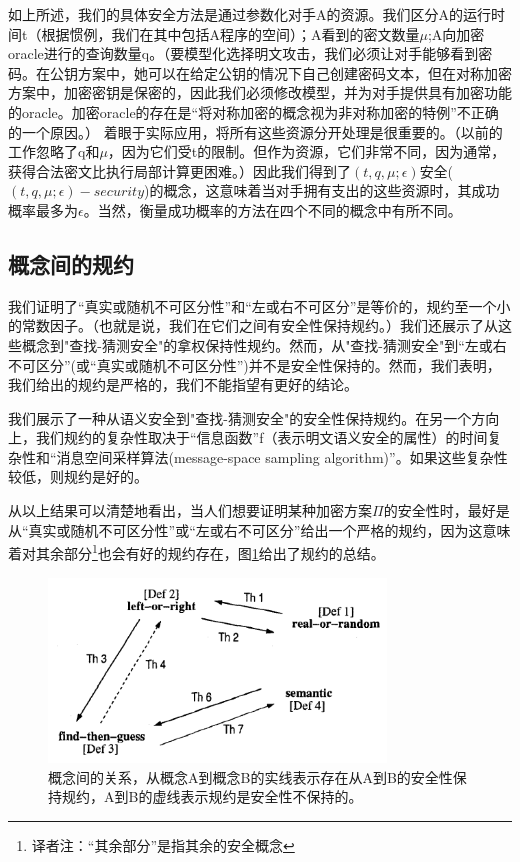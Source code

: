 \documentclass[]{article}
\begin{document}
如上所述，我们的具体安全方法是通过参数化对手A的资源。我们区分A的运行时间t（根据惯例，我们在其中包括A程序的空间）；A看到的密文数量$\mu$;A向加密oracle进行的查询数量q。（要模型化选择明文攻击，我们必须让对手能够看到密码。在公钥方案中，她可以在给定公钥的情况下自己创建密码文本，但在对称加密方案中，加密密钥是保密的，因此我们必须修改模型，并为对手提供具有加密功能的oracle。加密oracle的存在是“将对称加密的概念视为非对称加密的特例”不正确的一个原因。）
着眼于实际应用，将所有这些资源分开处理是很重要的。（以前的工作忽略了q和$\mu$，因为它们受t的限制。但作为资源，它们非常不同，因为通常，获得合法密文比执行局部计算更困难。）因此我们得到了$(t,q,\mu;\epsilon)$安全($(t,q,\mu;\epsilon)-security$)的概念，这意味着当对手拥有支出的这些资源时，其成功概率最多为$\epsilon$。当然，衡量成功概率的方法在四个不同的概念中有所不同。\par

\subsection{概念间的规约}
我们证明了“真实或随机不可区分性”和“左或右不可区分”是等价的，规约至一个小的常数因子。（也就是说，我们在它们之间有安全性保持规约。）我们还展示了从这些概念到"查找-猜测安全"的拿权保持性规约。然而，从"查找-猜测安全"到“左或右不可区分”(或“真实或随机不可区分性”)并不是安全性保持的。然而，我们表明，我们给出的规约是严格的，我们不能指望有更好的结论。\par

我们展示了一种从语义安全到"查找-猜测安全"的安全性保持规约。在另一个方向上，我们规约的复杂性取决于“信息函数”f（表示明文语义安全的属性）的时间复杂性和“消息空间采样算法(message-space sampling algorithm)”。如果这些复杂性较低，则规约是好的。\par

从以上结果可以清楚地看出，当人们想要证明某种加密方案$\Pi$的安全性时，最好是从“真实或随机不可区分性”或“左或右不可区分”给出一个严格的规约，因为这意味着对其余部分\footnote{译者注：“其余部分”是指其余的安全概念}也会有好的规约存在，图\ref{Fig:fig1}给出了规约的总结。\par

\begin{figure}[htbp]
	\centering
	\includegraphics[width=0.8\textwidth]{Fig1.png}
	\caption{概念间的关系，从概念A到概念B的实线表示存在从A到B的安全性保持规约，A到B的虚线表示规约是安全性不保持的。}
	\label{Fig:fig1}
\end{figure}
\end{document}

